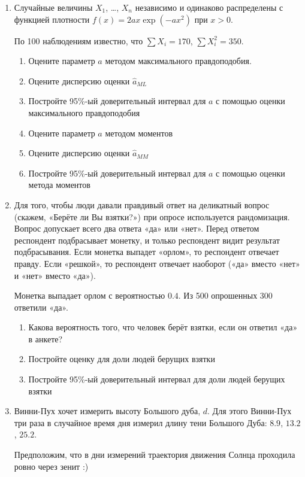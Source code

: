 \begin{enumerate}

\item Случайные величины $X_1$, \ldots, $X_n$ независимо и одинаково распределены с функцией плотности $f(x)=2ax\exp(-ax^2)$ при $x>0$.

По 100 наблюдениям известно, что $\sum X_i = 170$, $\sum X_i^2 = 350$.

\begin{enumerate}
\item Оцените параметр $a$ методом максимального правдоподобия.
\item Оцените дисперсию оценки $\hat a_{ML}$
\item Постройте 95\%-ый доверительный интервал для $a$ с помощью оценки максимального правдоподобия
\item Оцените параметр $a$ методом моментов
\item Оцените дисперсию оценки $\hat a_{MM}$
\item Постройте 95\%-ый доверительный интервал для $a$ с помощью оценки метода моментов
\end{enumerate}

\item Для того, чтобы люди давали правдивый ответ на деликатный вопрос (скажем, «Берёте ли Вы взятки?») при опросе используется рандомизация. Вопрос допускает всего два ответа «да» или «нет». Перед ответом респондент подбрасывает монетку, и только респондент видит результат подбрасывания. Если монетка выпадет «орлом», то респондент отвечает правду. Если «решкой», то респондент отвечает наоборот («да» вместо «нет» и «нет» вместо «да»).

Монетка выпадает орлом с вероятностью $0.4$. Из 500 опрошенных 300 ответили «да».

\begin{enumerate}
\item Какова вероятность того, что человек берёт взятки, если он ответил «да» в анкете?
\item Постройте оценку для доли людей берущих взятки
\item Постройте 95\%-ый доверительный интервал для доли людей берущих взятки
\end{enumerate}

\item Винни-Пух хочет измерить высоту Большого дуба, $d$. Для этого Винни-Пух три раза в случайное время дня измерил длину тени Большого Дуба: $8.9$, $13.2$, $25.2$.

Предположим, что в дни измерений траектория движения Солнца проходила ровно через зенит :)


\end{enumerate}
